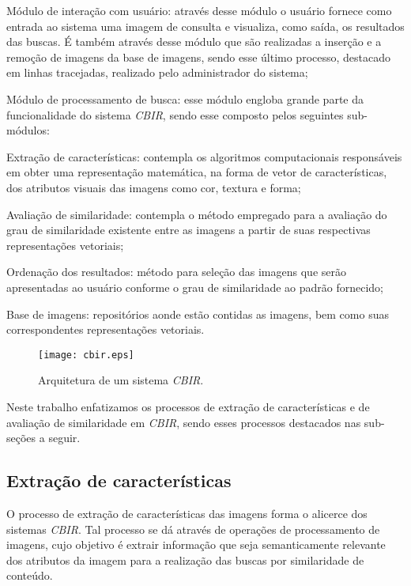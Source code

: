 \begin{alineas}
\item Módulo de interação com usuário: através desse módulo o usuário fornece como entrada ao sistema uma imagem de consulta e visualiza, como saída, os resultados das buscas. É também através desse módulo que são realizadas a inserção e a remoção de imagens da base de imagens, sendo esse último processo, destacado em linhas tracejadas, realizado pelo administrador do sistema;  
\item Módulo de processamento de busca: esse módulo engloba grande parte da funcionalidade do sistema \textit{CBIR}, sendo esse composto pelos seguintes sub-módulos:
\begin{alineas}
\item Extração de características: contempla os algoritmos computacionais responsáveis em obter uma representação matemática, na forma de vetor de características, dos atributos visuais das imagens como cor, textura e forma;
\item Avaliação de similaridade: contempla o método empregado para a avaliação do grau de similaridade existente entre as imagens a partir de suas respectivas representações vetoriais;
\item Ordenação dos resultados: método para seleção das imagens que serão apresentadas ao usuário conforme o grau de similaridade ao padrão fornecido;
\end{alineas} 
\item Base de imagens: repositórios aonde estão contidas as imagens, bem como suas correspondentes representações vetoriais.
\end{alineas}

\begin{figure} 
\centering
\caption{\label{fig:cbir} Arquitetura de um sistema \emph{CBIR}.}
\texttt{[image: cbir.eps]}
\end{figure}
 
Neste trabalho enfatizamos os processos de extração de características e de avaliação de similaridade em \emph{CBIR}, sendo esses processos destacados nas sub-seções a seguir.

\subsection{Extração de características}

O processo de extração de características das imagens forma o alicerce dos sistemas \emph{CBIR}. Tal processo se dá através de operações de processamento de imagens, cujo objetivo é extrair informação que seja semanticamente relevante dos atributos da imagem para a realização das buscas por similaridade de conteúdo. 

